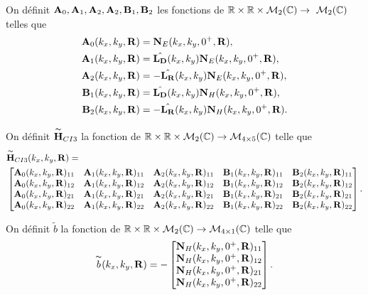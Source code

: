     \begin{defn}
      On définit \(\mathbf{A}_0,\mathbf{A}_1,\mathbf{A}_2,\mathbf{A}_2,\mathbf{B}_1,\mathbf{B}_2\) les fonctions de \(\mathbb R \times \mathbb R \times \mathcal{M}_2(\mathbb C) \rightarrow \ \mathcal{M}_2(\mathbb C)\) telles que        
      \begin{align*}
        \mathbf{A}_0(k_x,k_y,\mathbf{R}) &= \mathbf{N}_E(k_x,k_y,0^+,\mathbf{R}),
        \\
        \mathbf{A}_1(k_x,k_y,\mathbf{R}) &= \hat{\mathbf{L_D}}(k_x,k_y)\mathbf{N}_E(k_x,k_y,0^+,\mathbf{R}),
        \\
        \mathbf{A}_2(k_x,k_y,\mathbf{R}) &= -\hat{\mathbf{L_R}}(k_x,k_y)\mathbf{N}_E(k_x,k_y,0^+,\mathbf{R}),
        \\
        \mathbf{B}_1(k_x,k_y,\mathbf{R}) &= \hat{\mathbf{L_D}}(k_x,k_y)\mathbf{N}_H(k_x,k_y,0^+,\mathbf{R}),
        \\
        \mathbf{B}_2(k_x,k_y,\mathbf{R}) &= -\hat{\mathbf{L_R}}(k_x,k_y)\mathbf{N}_H(k_x,k_y,0^+,\mathbf{R}).            
      \end{align*}

      On définit \(\overset{\thicksim}{\mathbf{H}}_{CI3}\) la fonction de \(\mathbb R \times \mathbb R \times \mathcal{M}_2(\mathbb C) \rightarrow \mathcal{M}_{4\times5}(\mathbb C)\) telle que
      \begin{align*}
        & \overset{\thicksim}{\mathbf{H}}_{CI3}(k_x,k_y,\mathbf{R}) =  \\ &
        \begin{bmatrix}
          \mathbf{A}_0(k_x,k_y,\mathbf{R})_{11} & \mathbf{A}_1(k_x,k_y,\mathbf{R})_{11} & \mathbf{A}_2(k_x,k_y,\mathbf{R})_{11} & \mathbf{B}_1(k_x,k_y,\mathbf{R})_{11} & \mathbf{B}_2(k_x,k_y,\mathbf{R})_{11}
          \\
          \mathbf{A}_0(k_x,k_y,\mathbf{R})_{12} & \mathbf{A}_1(k_x,k_y,\mathbf{R})_{12} & \mathbf{A}_2(k_x,k_y,\mathbf{R})_{12} & \mathbf{B}_1(k_x,k_y,\mathbf{R})_{12} & \mathbf{B}_2(k_x,k_y,\mathbf{R})_{12}
          \\
          \mathbf{A}_0(k_x,k_y,\mathbf{R})_{21} & \mathbf{A}_1(k_x,k_y,\mathbf{R})_{21} & \mathbf{A}_2(k_x,k_y,\mathbf{R})_{21} & \mathbf{B}_1(k_x,k_y,\mathbf{R})_{21} & \mathbf{B}_2(k_x,k_y,\mathbf{R})_{21}
          \\
          \mathbf{A}_0(k_x,k_y,\mathbf{R})_{22} & \mathbf{A}_1(k_x,k_y,\mathbf{R})_{22} & \mathbf{A}_2(k_x,k_y,\mathbf{R})_{22} & \mathbf{B}_1(k_x,k_y,\mathbf{R})_{22} & \mathbf{B}_2(k_x,k_y,\mathbf{R})_{22}
        \end{bmatrix}.
      \end{align*}

      On définit \(\tilde{b}\) la fonction de \(\mathbb R \times \mathbb R \times \mathcal{M}_2(\mathbb C) \rightarrow \mathcal{M}_{4\times1}(\mathbb C)\) telle que
      \begin{equation*}
        \overset{\thicksim}{b}(k_x,k_y,\mathbf{R}) = -
        \begin{bmatrix}
          \mathbf{N}_H(k_x,k_y,0^+,\mathbf{R})_{11}
          \\
          \mathbf{N}_H(k_x,k_y,0^+,\mathbf{R})_{12}
          \\
          \mathbf{N}_H(k_x,k_y,0^+,\mathbf{R})_{21}
          \\
          \mathbf{N}_H(k_x,k_y,0^+,\mathbf{R})_{22}
        \end{bmatrix}.
      \end{equation*}
    \end{defn}

